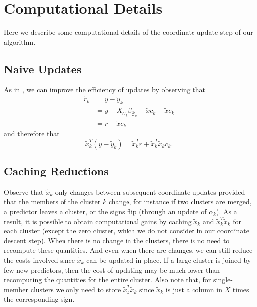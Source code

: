 \section{Computational Details}

\label{sec:computational-details}

Here we describe some computational details of the coordinate update step of our algorithm.

\subsection{Naive Updates}

As in \textcite{friedman2010}, we can improve the efficiency of updates by observing that
\begin{equation*}
  \begin{aligned}
    \tilde r_k & = y - \tilde y_k                                                                       \\
               & = y - X_{\bar{\mathcal{C}}_k}\beta_{\bar{\mathcal{C}}_k} - \tilde x c_k + \tilde x c_k \\
               & = r + \tilde x c_k
  \end{aligned}
\end{equation*}
and therefore that
\begin{equation}
  \label{eq:naive-update}
  \tilde x_k^T (y - \tilde y_k) = \tilde x_k^T r + \tilde x_k^T \tilde x_k c_k.
\end{equation}

\subsection{Caching Reductions}

Observe that \(\tilde x_k\) only changes between subsequent coordinate updates provided that the members of the cluster \(k\) change, for instance if two clusters are merged, a predictor leaves a cluster, or the signs flip (through an update of \(\alpha_k\)).
As a result, it is possible to obtain computational gains by caching \(\tilde x_k\) and \(\tilde x_k^T \tilde x_k\) for each cluster (except the zero cluster, which we do not consider in our coordinate descent step).
When there is no change in the clusters, there is no need to recompute these quantities.
And even when there are changes, we can still reduce the costs involved since \(\tilde x_k\) can be updated in place.
If a large cluster is joined by few new predictors, then the cost of updating may be much lower than recomputing the quantities for the entire cluster.
Also note that, for single-member clusters we only need to store \(\tilde x_k^T \tilde x_k\) since \(\tilde x_k\) is just a column in \(X\) times the corresponding sign.

